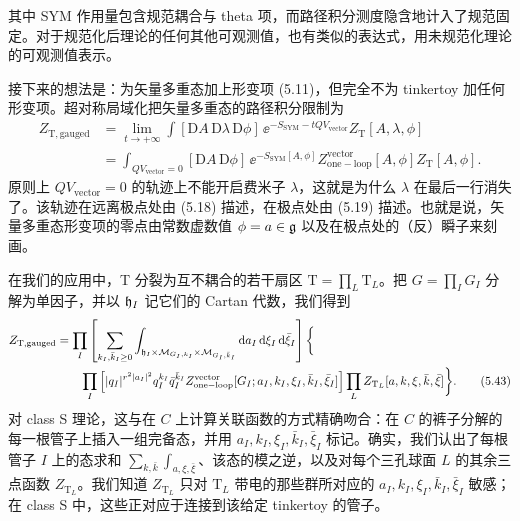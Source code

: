其中 SYM 作用量包含规范耦合与 theta 项，而路径积分测度隐含地计入了规范固定。对于规范化后理论的任何其他可观测值，也有类似的表达式，用未规范化理论的可观测值表示。

接下来的想法是：为矢量多重态加上形变项 (5.11)，但完全不为 tinkertoy 加任何形变项。超对称局域化把矢量多重态的路径积分限制为
\begin{align}
  Z_{\mathrm{T,gauged}} &= \lim_{t\to+\infty}\int[\mathrm{D}A\,\mathrm{D}\lambda\,\mathrm{D}\phi]\,\ee^{-S_{\mathrm{SYM}}-tQV_{\mathrm{vector}}}Z_{\mathrm{T}}[A,\lambda,\phi] \nonumber\\
  &= \int_{QV_{\mathrm{vector}}=0}[\mathrm{D}A\,\mathrm{D}\phi]\,\ee^{-S_{\mathrm{SYM}}[A,\phi]}Z^{\mathrm{vector}}_{\mathrm{one-loop}}[A,\phi]Z_{\mathrm{T}}[A,\phi].
  \tag{5.42}
\end{align}
原则上 $QV_{\mathrm{vector}}=0$ 的轨迹上不能开启费米子 $\lambda$，这就是为什么 $\lambda$ 在最后一行消失了。该轨迹在远离极点处由 (5.18) 描述，在极点处由 (5.19) 描述。也就是说，矢量多重态形变项的零点由常数虚数值 $\phi=a\in\mathfrak{g}$ 以及在极点处的（反）瞬子来刻画。

在我们的应用中，T 分裂为互不耦合的若干扇区 $\mathrm{T}=\prod_L\mathrm{T}_L$。把 $G=\prod_I G_I$ 分解为单因子，并以 $\mathfrak{h}_I$ 记它们的 Cartan 代数，我们得到
\begin{align}
  Z_{\mathrm{T,gauged}} &= \prod_I\left[\sum_{k_I,\bar k_I\ge0}\int_{\mathfrak{h}_I\times\mathcal{M}_{G_I,k_I}\times\mathcal{M}_{G_I,\bar k_I}}\mathrm{d} a_I\,\mathrm{d}\xi_I\,\mathrm{d}\bar\xi_I\right]\bigg\{ \nonumber\\
  &\qquad\prod_I\left[|q_I|^{r^2|a_I|^2}q_I^{k_I}\bar q_I^{\bar k_I}Z^{\mathrm{vector}}_{\mathrm{one-loop}}[G_I;a_I,k_I,\xi_I,\bar k_I,\bar\xi_I]\right]\prod_L Z_{\mathrm{T}_L}[a,k,\xi,\bar k,\bar\xi]\bigg\}.
  \tag{5.43}
\end{align}
对 class S 理论，这与在 $C$ 上计算关联函数的方式精确吻合：在 $C$ 的裤子分解的每一根管子上插入一组完备态，并用 $a_I,k_I,\xi_I,\bar k_I,\bar\xi_I$ 标记。确实，我们认出了每根管子 $I$ 上的态求和 $\sum_{k,\bar k}\int_{a,\xi,\bar\xi}$、该态的模之逆，以及对每个三孔球面 $L$ 的其余三点函数 $Z_{\mathrm{T}_L}$。我们知道 $Z_{\mathrm{T}_L}$ 只对 $\mathrm{T}_L$ 带电的那些群所对应的 $a_I,k_I,\xi_I,\bar k_I,\bar\xi_I$ 敏感；在 class S 中，这些正对应于连接到该给定 tinkertoy 的管子。


